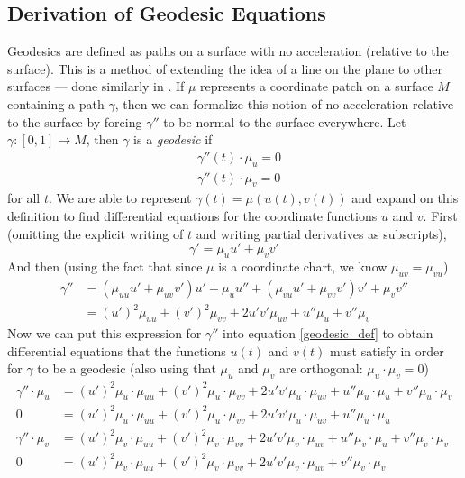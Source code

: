 \documentclass{article}
\begin{document}
	\subsection{Derivation of Geodesic Equations}
		Geodesics are defined as paths on a surface with no acceleration (relative to the surface).
		This is a method of extending the idea of a line on the plane to other surfaces --- done similarly in \cite{Lewis_GeodesicsMathematica_2002}.
		If $\mu$ represents a coordinate patch on a surface $M$ containing a path $\gamma$, then we can formalize this notion of no acceleration relative to the surface by forcing $\gamma''$ to be normal to the surface everywhere.
		Let $\gamma:[0,1] \to M$, then $\gamma$ is a \textit{geodesic} if
		\begin{equation} \label{geodesic_def} \begin{split}
			&\gamma''(t) \cdot \mu_u = 0 \\
			&\gamma''(t) \cdot \mu_v = 0
		\end{split} \end{equation}
		for all $t$.
		We are able to represent $\gamma(t) = \mu( u(t) , v(t) )$ and expand on this definition to find differential equations for the coordinate functions $u$ and $v$.
		First (omitting the explicit writing of $t$ and writing partial derivatives as subscripts),
		\begin{equation*}
			\gamma' = \mu_u u'+\mu_v v'
		\end{equation*}
		And then (using the fact that since $\mu$ is a coordinate chart, we know $\mu_{uv}=\mu_{vu}$)
		\begin{equation*} \begin{split}
			\gamma'' & = (\mu_{uu} u' + \mu_{uv} v')u' + \mu_u u'' + (\mu_{vu} u' + \mu_{vv} v') v' + \mu_v v'' \\
					 & = (u')^2 \mu_{uu} + (v')^2\mu_{vv} + 2u' v'\mu_{uv} + u''\mu_u + v''\mu_v
		\end{split} \end{equation*}
		Now we can put this expression for $\gamma''$ into equation \ref{geodesic_def} to obtain differential equations that the functions $u(t)$ and $v(t)$ must satisfy in order for $\gamma$ to be a geodesic (also using that $\mu_u$ and $\mu_v$ are orthogonal: $\mu_u \cdot \mu_v = 0$)
		\begin{equation} \label{geodesic_work} \begin{split}
			\gamma'' \cdot \mu_u & = (u')^2\mu_u \cdot \mu_{uu} + (v')^2\mu_u \cdot \mu_{vv} + 2u' v'\mu_u \cdot \mu_{uv} + u''\mu_u \cdot \mu_u + v''\mu_u \cdot \mu_v \\
			0 & = (u')^2\mu_u \cdot \mu_{uu} + (v')^2\mu_u \cdot \mu_{vv} + 2u' v'\mu_u \cdot \mu_{uv} + u''\mu_u \cdot \mu_u \\
			\gamma'' \cdot \mu_v & = (u')^2\mu_v \cdot \mu_{uu} + (v')^2\mu_v \cdot \mu_{vv} + 2u' v'\mu_v \cdot \mu_{uv} + u''\mu_v \cdot \mu_u + v''\mu_v \cdot \mu_v \\
			0 & = (u')^2\mu_v \cdot \mu_{uu} + (v')^2\mu_v \cdot \mu_{vv} + 2u' v'\mu_v \cdot \mu_{uv} + v''\mu_v \cdot \mu_v \\
		\end{split} \end{equation}
\end{document}
